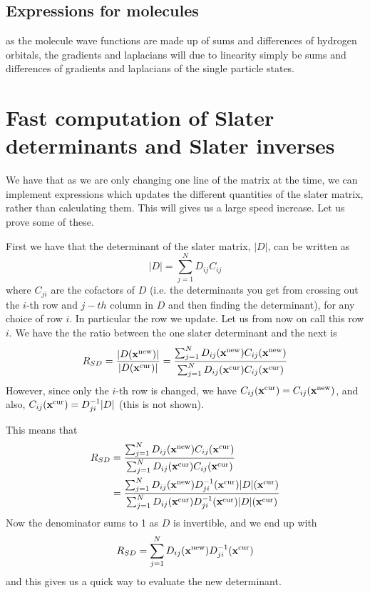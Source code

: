 \documentclass[aps,prc,twocolumn,floatfix]{revtex4}
\def\xvec{\textbf{x}}
\begin{document}
\begin{appendices}
 
 \subsection{Expressions for molecules}
 as the molecule wave functions are made up of sums and differences of hydrogen orbitals, the gradients and laplacians will due to linearity simply be sums and differences of gradients and laplacians of the single particle states. 
 
 \label{sec:molgrad}
 
 \section{Fast computation of Slater determinants and Slater inverses}
 \label{sec:fastdet}
 We have that as we are only changing one line of the matrix at the time, we can implement expressions which updates the different quantities of the slater matrix, rather than calculating them. This will gives us a large speed increase. Let us prove some of these. 

First we have that the determinant of the slater matrix, $|D|$, can be written as 
\begin{equation}
 |D| = \sum_{j=1}^N D_{ij}C_{ij}
\end{equation}
where $C_{ji}$ are the cofactors of $D$ (i.e. the determinants you get from crossing out the $i$-th row and $j-th$ column in $D$ and then finding the determinant), for any choice of row $i$. In particular the row we update. Let us from now on call this row $i$. We have the the ratio between the one slater determinant and the next is
\begin{equation}
 R_{SD} = {|D(\xvec^{\rm new})| \over |D(\xvec^{\rm cur})|} = {\sum_{j=1}^N D_{ij}(\xvec^{\rm new}) C_{ij}(\xvec^{\rm new}) \over \sum_{j=1}^N D_{ij}(\xvec^{\rm cur}) C_{ij}(\xvec^{\rm cur})}
\end{equation}
However, since only the $i$-th row is changed, we have $C_{ij}(\xvec^{\rm cur}) = C_{ij}(\xvec^{\rm new})$, and also, $C_{ij}(\xvec^{\rm cur}) = D_{ji}^{-1}|D|$ (this is not shown). 

This means that 
\begin{align}
 R_{SD} &= {\sum_{j=1}^N D_{ij}(\xvec^{\rm new}) C_{ij}(\xvec^{\rm cur}) \over \sum_{j=1}^N D_{ij}(\xvec^{\rm cur}) C_{ij}(\xvec^{\rm cur})} \\ 
 & = {\sum_{j=1}^N D_{ij}(\xvec^{\rm new}) D_{ji}^{-1}(\xvec^{\rm cur}) |D|(\xvec^{\rm cur}) \over \sum_{j=1}^N D_{ij}(\xvec^{\rm cur}) D_{ji}^{-1}(\xvec^{\rm cur}) |D|(\xvec^{\rm cur})}
\end{align}
Now the denominator sums to 1 as $D$ is invertible, and we end up with
\begin{equation}
 R_{SD} = \sum_{j=1}^N D_{ij}(\xvec^{\rm new})D_{ji}^{-1}(\xvec^{\rm cur})
\end{equation}
and this gives us a quick way to evaluate the new determinant. 


\end{appendices}
\end{document}
